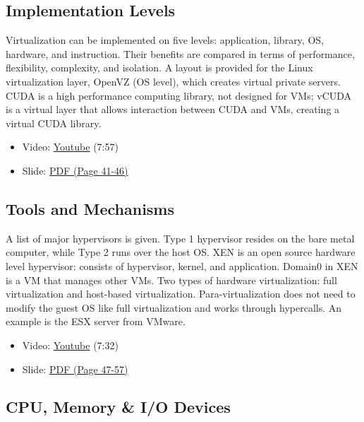 \subsection{Implementation Levels}\label{implementation-levels}

Virtualization can be implemented on five levels: application, library,
OS, hardware, and instruction. Their benefits are compared in terms of
performance, flexibility, complexity, and isolation. A layout is
provided for the Linux virtualization layer, OpenVZ (OS level), which
creates virtual private servers. CUDA is a high performance computing
library, not designed for VMs; vCUDA is a virtual layer that allows
interaction between CUDA and VMs, creating a virtual CUDA library.

\begin{itemize}
\tightlist
\item
  Video: \href{https://www.youtube.com/watch?v=Le-kv-eAhvg}{Youtube}
  (7:57)
\item
  Slide:
  \href{https://drive.google.com/open?id=0B88HKpainTSfQU1uQmxZWHdWQ1k}{PDF
  (Page 41-46)}
\end{itemize}

\subsection{Tools and Mechanisms}\label{tools-and-mechanisms}

A list of major hypervisors is given. Type 1 hypervisor resides on the
bare metal computer, while Type 2 runs over the host OS. XEN is an open
source hardware level hypervisor: consists of hypervisor, kernel, and
application. Domain0 in XEN is a VM that manages other VMs. Two types of
hardware virtualization: full virtualization and host-based
virtualization. Para-virtualization does not need to modify the guest OS
like full virtualization and works through hypercalls. An example is the
ESX server from VMware.

\begin{itemize}
\tightlist
\item
  Video: \href{https://www.youtube.com/watch?v=VYz5rp5HDVE}{Youtube}
  (7:32)
\item
  Slide:
  \href{https://drive.google.com/open?id=0B88HKpainTSfQU1uQmxZWHdWQ1k}{PDF
  (Page 47-57)}
\end{itemize}

\subsection{CPU, Memory \& I/O Devices}\label{cpu-memory-io-devices}

